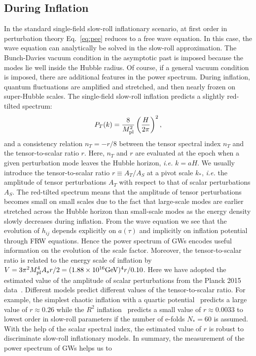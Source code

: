 \documentclass[a4paper,11pt]{article}
\begin{document}
\subsection{During Inflation}
\label{subsec:inflation}


In the standard single-field slow-roll inflationary scenario, at first order in perturbation theory Eq.~\eqref{eq:pee} reduces to a free wave equation. In this case, the wave equation can analytically be solved in the slow-roll approximation. The Bunch-Davies vacuum condition in the asymptotic past is imposed because the modes lie well inside the Hubble radius. Of course, if a general vacuum condition is imposed, there are additional features in the power spectrum. During inflation, quantum fluctuations are amplified and stretched, and then nearly frozen on super-Hubble scales. The single-field slow-roll inflation predicts a slightly red-tilted spectrum:
\begin{eqnarray}
P_{T}(k)=\frac{8}{M^2_{\rm pl}}\left(\frac{H}{2\pi}\right)^2,
\end{eqnarray}
and a consistency relation $n_{T}=-r/8$ between the tensor spectral index $n_{T}$ and the tensor-to-scalar ratio $r$. Here, $n_T$ and $r$ are evaluated at the epoch when a given perturbation mode leaves the Hubble horizon, {\it i.e.} $k=aH$. We usually introduce the tensor-to-scalar ratio $r\equiv A_{T}/A_{S}$ at a pivot scale $k_{\ast}$, {\it i.e.} the amplitude of tensor perturbations $A_{T}$ with respect to that of scalar perturbations $A_{S}$. The red-tilted spectrum means that the amplitude of tensor perturbations becomes small on small scales due to the fact that large-scale modes are earlier stretched across the Hubble horizon than small-scale modes as the energy density slowly decreases during inflation. From the wave equation we see that the evolution of $h_{ij}$ depends explicitly on $a(\tau)$ and implicitly on inflation potential through FRW equations. Hence the power spectrum of GWs encodes useful information on the evolution of the scale factor. Moreover, the tensor-to-scalar ratio is related to the energy scale of inflation by $V=3\pi^2M_{\rm pl}^4A_sr/2=(1.88\times10^{16} {\rm GeV})^4 r/0.10$. Here we have adopted the estimated value of the amplitude of scalar perturbations from the Planck 2015 data~\cite{Ade:2015lrj}. Different models predict different values of the tensor-to-scalar ratio. For example, the simplest chaotic inflation with a quartic potential~\cite{Linde:1981mu} predicts a large value of $r\approx 0.26$ while the $R^2$ inflation~\cite{Starobinsky:1980te} predicts a small value of $r\approx 0.0033$ to lowest order in slow-roll parameters if  the number of e-folds $N_{\ast}=60$ is assumed. With the help of the scalar spectral index, the estimated value of $r$ is robust to discriminate slow-roll inflationary models. In summary, the measurement of the power spectrum of GWs helps us to
\end{document}
